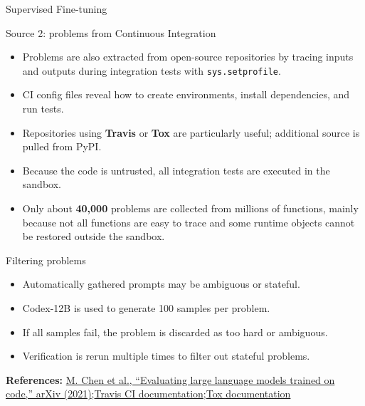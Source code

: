 \documentclass[aspectratio=43,9pt]{beamer}
\newcommand{\srclink}[2]{\href{#2}{\textcolor{black!68}{#1}}}
\newcommand{\sep}{;\hspace{0.35em}}
\newcommand{\refline}[2][References]{%
  \vfill
  {\raggedright\fontsize{5.1}{5.5}\selectfont\color{black!68}\textbf{#1:} #2\par}%
}
\newcommand{\srcChen}{\srclink{M. Chen et al., ``Evaluating large language models trained on code,'' arXiv (2021)}{https://arxiv.org/abs/2107.03374}}
\newcommand{\srcTravis}{\srclink{Travis CI documentation}{https://www.travis-ci.com/}}
\newcommand{\srcTox}{\srclink{Tox documentation}{https://tox.wiki/}}
\begin{document}
\begin{frame}{Supervised Fine-tuning}
\scriptsize
\begin{block}{Source 2: problems from Continuous Integration}
\begin{itemize}
  \item Problems are also extracted from open-source repositories by tracing inputs and outputs during integration tests with \texttt{sys.setprofile}.
  \item CI config files reveal how to create environments, install dependencies, and run tests.
  \item Repositories using \textbf{Travis} or \textbf{Tox} are particularly useful; additional source is pulled from PyPI.
  \item Because the code is untrusted, all integration tests are executed in the sandbox.
  \item Only about \textbf{40,000} problems are collected from millions of functions, mainly because not all functions are easy to trace and some runtime objects cannot be restored outside the sandbox.
\end{itemize}
\end{block}

\begin{block}{Filtering problems}
\begin{itemize}
  \item Automatically gathered prompts may be ambiguous or stateful.
  \item Codex-12B is used to generate 100 samples per problem.
  \item If all samples fail, the problem is discarded as too hard or ambiguous.
  \item Verification is rerun multiple times to filter out stateful problems.
\end{itemize}
\end{block}

\refline{\srcChen\sep \srcTravis\sep \srcTox}
\end{frame}
\end{document}
